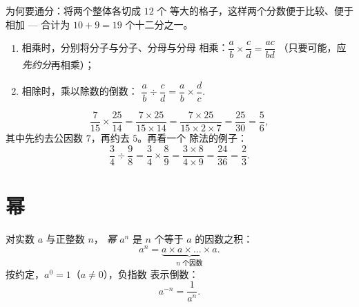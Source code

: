\begin{omfigure}

{\small 为何要通分：将两个整体各切成 $12$ 个
等大的格子，这样两个分数便于比较、便于相加 ---
合计为 $10 + 9 = 19$ 个十二分之一。}
\end{omfigure}

\begin{method}[分数的乘除法]\label{met:g9:fractions:mult}
\begin{enumerate}
  \item 相乘时，分别将分子与分子、分母与分母
        相乘：$\dfrac ab \times \dfrac cd = \dfrac{ac}{bd}$
        （只要可能，应\emph{先约分}再相乘）；
  \item 相除时，乘以除数的倒数：
        $\dfrac ab \div \dfrac cd = \dfrac ab \times \dfrac dc$.
\end{enumerate}
\end{method}

\begin{example}\label{ex:g9:fractions:mult}
\[
\frac{7}{15} \times \frac{25}{14}
= \frac{7 \times 25}{15 \times 14}
= \frac{7 \times 25}{15 \times 2 \times 7}
= \frac{25}{30} = \frac56,
\]
其中先约去公因数 $7$，再约去 $5$。再看一个
除法的例子：
\[
\frac{3}{4} \div \frac{9}{8}
= \frac34 \times \frac89
= \frac{3 \times 8}{4 \times 9}
= \frac{24}{36} = \frac23 .
\]
\end{example}

\section{幂}

\begin{definition}[幂]\label{def:g9:fractions:power}
对实数 $a$ 与正整数 $n$，
\emph{幂} $a^n$ 是 $n$ 个等于
$a$ 的因数之积：
\[
a^n = \underbrace{a \times a \times \dots \times a}_{n \text{ 个因数}} .
\]
按约定，$a^0 = 1$（$a \neq 0$），负指数
表示倒数：
\[
a^{-n} = \frac{1}{a^n}.
\]
\end{definition}

